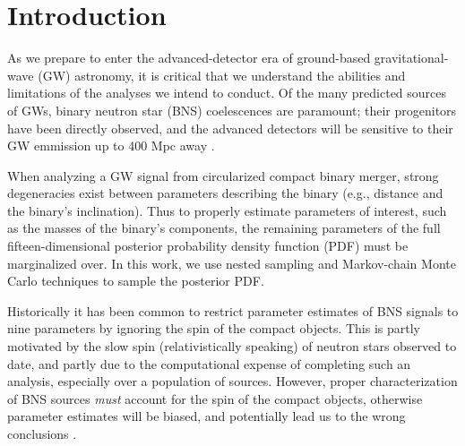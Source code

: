 \section{Introduction}

As we prepare to enter the advanced-detector era of ground-based gravitational-wave (GW) astronomy, it is critical that we understand the abilities and limitations of the analyses we intend to conduct.  Of the many predicted sources of GWs, binary neutron star (BNS) coelescences are paramount; their progenitors have been directly observed, and the advanced detectors will be sensitive to their GW emmission up to 400 Mpc away \citep{2013arXiv1304.0670L}.

When analyzing a GW signal from circularized compact binary merger, strong degeneracies exist between parameters describing the binary (e.g., distance and the binary's inclination).  Thus to properly estimate parameters of interest, such as the masses of the binary's components, the remaining parameters of the full fifteen-dimensional posterior probability density function (PDF) must be marginalized over.  In this work, we use nested sampling  and Markov-chain Monte Carlo \citep{Christensen_2003,R_ver_2006,van_der_Sluys_2008} techniques to sample the posterior PDF.

Historically it has been common to restrict parameter estimates of BNS signals to nine parameters by ignoring the spin of the compact objects.  This is partly motivated by the slow spin (relativistically speaking) of neutron stars observed to date, and partly due to the computational expense of completing such an analysis, especially over a population of sources.  However, proper characterization of BNS sources \emph{must} account for the spin of the compact objects, otherwise parameter estimates will be biased, and potentially lead us to the wrong conclusions \citep{Buonanno_2009}.

